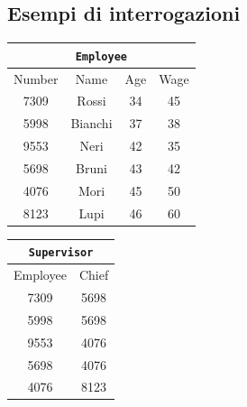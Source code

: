 \documentclass[a4paper,12pt]{article}
\begin{document}
\subsection{Esempi di interrogazioni}

\begin{center}
\begin{tabular}{cccc}
\multicolumn{4}{c}{\texttt{Employee}}\\ \hline
Number & Name & Age & Wage\\ \hline
7309 & Rossi & 34 & 45\\
5998 & Bianchi & 37 & 38\\
9553 & Neri & 42 & 35\\
5698 & Bruni & 43 & 42\\
4076 & Mori & 45 & 50\\
8123 & Lupi & 46 & 60\\ \hline
\end{tabular}
\qquad
\begin{tabular}{cc}
\multicolumn{2}{c}{\texttt{Supervisor}}\\ \hline
Employee & Chief\\ \hline
7309 & 5698\\
5998 & 5698\\
9553 & 4076\\
5698 & 4076\\
4076 & 8123\\ \hline
\end{tabular}
\end{center}
\end{document}
